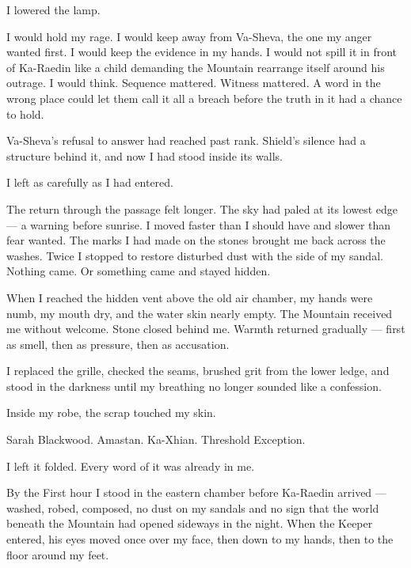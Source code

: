 I lowered the lamp.\par

I would hold my rage. I would keep away from Va-Sheva, the one my anger wanted first. I would keep the evidence in my hands. I would not spill it in front of Ka-Raedin like a child demanding the Mountain rearrange itself around his outrage. I would think. Sequence mattered. Witness mattered. A word in the wrong place could let them call it all a breach before the truth in it had a chance to hold.\par

Va-Sheva's refusal to answer had reached past rank. Shield's silence had a structure behind it, and now I had stood inside its walls.\par

I left as carefully as I had entered.\par

The return through the passage felt longer. The sky had paled at its lowest edge --- a warning before sunrise. I moved faster than I should have and slower than fear wanted. The marks I had made on the stones brought me back across the washes. Twice I stopped to restore disturbed dust with the side of my sandal. Nothing came. Or something came and stayed hidden.\par

When I reached the hidden vent above the old air chamber, my hands were numb, my mouth dry, and the water skin nearly empty. The Mountain received me without welcome. Stone closed behind me. Warmth returned gradually --- first as smell, then as pressure, then as accusation.\par

I replaced the grille, checked the seams, brushed grit from the lower ledge, and stood in the darkness until my breathing no longer sounded like a confession.\par

Inside my robe, the scrap touched my skin.\par

Sarah Blackwood. Amastan. Ka-Xhian. Threshold Exception.\par

I left it folded. Every word of it was already in me.\par

By the First hour I stood in the eastern chamber before Ka-Raedin arrived --- washed, robed, composed, no dust on my sandals and no sign that the world beneath the Mountain had opened sideways in the night. When the Keeper entered, his eyes moved once over my face, then down to my hands, then to the floor around my feet.\par

